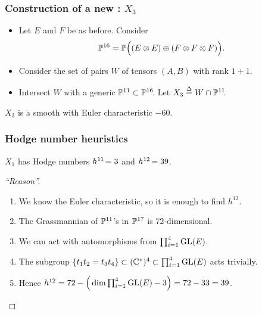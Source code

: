 \begin{frame}
    \frametitle{Construction of a new \CY: $X_3$}

    \begin{itemize}
    	\item
    	Let $E$ and $F$ be as before. Consider
        \[
            \P^{16} = \P\Big((E \otimes E) \oplus (F \otimes F \otimes F)\Big).
        \]
        
        \item
        Consider the set of pairs $W$ of tensors $(A, B)$ with rank $1 + 1$.

        \item
        Intersect $W$ with a generic $\P^{11} \subset \P^{16}\mkern-4mu$. Let $X_3 \defeq  W \cap \P^{11}\mkern-4mu$.
    \end{itemize}

    \begin{theorem}
        $X_3$ is a smooth \CY with Euler characteristic $-60$.
    \end{theorem}
\end{frame}


\begin{frame}
    \frametitle{Hodge number heuristics}

    \begin{conjecture}
        $X_1$ has Hodge numbers $h^{11}\mkern-3mu = 3$ and $h^{12}\mkern-2mu = 39$.
    \end{conjecture}

    \begin{proof}[``Reason'']
        \begin{enumerate}[<+->]
            \item
	        We know the Euler characteristic, so it is enough to find $h^{12}$.

            \item
            The Grassmannian of $\P^{11}$'s in $\P^{17}$ is $72$-dimensional.

            \item
            We can act with automorphisms from $\prod_{i = 1}^4 \GL(E)$.

            \item
            The subgroup $\{ t_1t_2 = t_3t_4 \} \subset (\C^\ast)^4 \subset \prod_{i = 1}^4 \GL(E)$ acts trivially.
            \vspace*{-0.5ex}

            \item
            Hence $h^{12} = 72 - \Big(\dim \prod_{i = 1}^4 \GL(E) - 3\Big) = 72-33 = 39$.
            \qedhere
        \end{enumerate}
    \end{proof}
\end{frame}